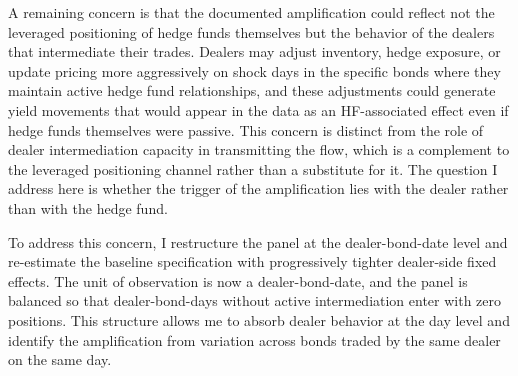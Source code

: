 \documentclass[english, 11pt, oneside]{article}
\begin{document}
A remaining concern is that the documented amplification could reflect not the leveraged positioning of hedge funds themselves but the behavior of the dealers that intermediate their trades. Dealers may adjust inventory, hedge exposure, or update pricing more aggressively on shock days in the specific bonds where they maintain active hedge fund relationships, and these adjustments could generate yield movements that would appear in the data as an HF-associated effect even if hedge funds themselves were passive. This concern is distinct from the role of dealer intermediation capacity in transmitting the flow, which is a complement to the leveraged positioning channel rather than a substitute for it. The question I address here is whether the trigger of the amplification lies with the dealer rather than with the hedge fund.

To address this concern, I restructure the panel at the dealer-bond-date level and re-estimate the baseline specification with progressively tighter dealer-side fixed effects. The unit of observation is now a dealer-bond-date, and the panel is balanced so that dealer-bond-days without active intermediation enter with zero positions. This structure allows me to absorb dealer behavior at the day level and identify the amplification from variation across bonds traded by the same dealer on the same day.
\end{document}
